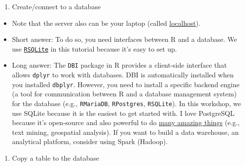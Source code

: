 \documentclass[
]{book}
\providecommand{\tightlist}{%
  \setlength{\itemsep}{0pt}\setlength{\parskip}{0pt}}
\begin{document}
\begin{enumerate}
\def\labelenumi{\arabic{enumi}.}
\tightlist
\item
  Create/connect to a database
\end{enumerate}

\begin{itemize}
\item
  Note that the server also can be your laptop (called \href{https://en.wikipedia.org/wiki/Localhost\#:~:text=In\%20computer\%20networking\%2C\%20localhost\%20is,via\%20the\%20loopback\%20network\%20interface.}{localhost}).
\item
  Short answer: To do so, you need interfaces between R and a database. We use \href{https://github.com/r-dbi/RSQLite}{\texttt{RSQLite}} in this tutorial because it's easy to set up.
\item
  Long answer: The \texttt{DBI} package in R provides a client-side interface that allows \texttt{dplyr} to work with databases. DBI is automatically installed when you installed \texttt{dbplyr}. However, you need to install a specific backend engine (a tool for communication between R and a database management system) for the database (e.g., \texttt{RMariaDB}, \texttt{RPostgres}, \texttt{RSQLite}). In this workshop, we use SQLite because it is the easiest to get started with. I love PostgreSQL because it's open-source and also powerful to do \href{https://www.postgresql.org/docs/current/functions.html}{many amazing things} (e.g., text mining, geospatial analysis). If you want to build a data warehouse, an analytical platform, consider using Spark (Hadoop).
\end{itemize}

\begin{enumerate}
\def\labelenumi{\arabic{enumi}.}
\setcounter{enumi}{1}
\tightlist
\item
  Copy a table to the database
\end{enumerate}
\end{document}

